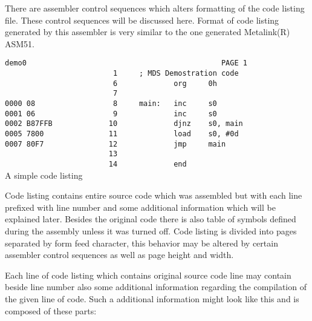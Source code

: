     There are assembler control sequences which alters formatting of the code listing file. These control sequences will be discussed here. Format of code listing generated by this assembler is very similar to the one generated Metalink(R) ASM51.

    \begin{code}[h]
        \mysmallfont{}
        \verb'demo0                                             PAGE 1'\\
        \verb'                         1     ; MDS Demostration code'\\
        \verb'                         6             org     0h'\\
        \verb'                         7'\\
        \verb'0000 08                  8     main:   inc     s0'\\
        \verb'0001 06                  9             inc     s0'\\
        \verb'0002 B87FFB             10             djnz    s0, main'\\
        \verb'0005 7800               11             load    s0, #0d'\\
        \verb'0007 80F7               12             jmp     main'\\
        \verb'                        13'\\
        \verb'                        14             end'\\
        \caption{A simple code listing}
    \end{code}

    Code listing contains entire source code which was assembled but with each line prefixed with line number and some additional information which will be explained later. Besides the original code there is also table of symbols defined during the assembly unless it was turned off. Code listing is divided into pages separated by form feed character, this behavior may be altered by certain assembler control sequences as well as page height and width.

    Each line of code listing which contains original source code line may contain beside line number also some additional information regarding the compilation of the given line of code. Such a additional information might look like this and is composed of these parts:

